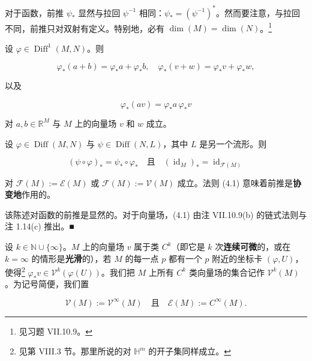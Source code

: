 \begin{remark}

\begin{items}
\item

对于函数，前推 $ \psi_{*} $ 显然与拉回 $ \psi^{-1} $ 相同：$ \psi_{*} = (\psi^{-1})^{*} $。然而要注意，与拉回不同，前推只对双射有定义。特别地，必有 $ \dim(M) = \dim(N) $。\footnote{见习题 VII.10.9。}

\item

设 $ \varphi \in \operatorname{Diff}^{1}(M,N) $。则

\[
\varphi_{*}(a+b) = \varphi_{*}a + \varphi_{*}b , \quad \varphi_{*}(v+w) = \varphi_{*}v + \varphi_{*}w ,
\]

以及

\[
\varphi_{*}(av) = \varphi_{*}a\,\varphi_{*}v
\]

对 $ a, b \in \mathbb{R}^{M} $ 与 $ M $ 上的向量场 $ v $ 和 $ w $ 成立。

\item

设 $ \varphi \in \operatorname{Diff}(M,N) $ 与 $ \psi \in \operatorname{Diff}(N,L) $，其中 $ L $ 是另一个流形。则

\begin{equation}
(\psi \circ \varphi)_{*} = \psi_{*} \circ \varphi_{*} \quad \text{且} \quad (\operatorname{id}_{M})_{*} = \operatorname{id}_{\mathcal{F}(M)}\tag{4.1}
\end{equation}

对 $ \mathcal{F}(M) := \mathcal{E}(M) $ 或 $ \mathcal{F}(M) := \mathcal{V}(M) $ 成立。法则 (4.1) 意味着前推是\textbf{协变地}作用的。

\proofhead
该陈述对函数的前推是显然的。对于向量场，(4.1) 由注 VII.10.9(b) 的链式法则与注 1.14(c) 推出。\nobreak\hspace{0.35em}■
\end{items}

设 $ k \in \mathbb{N} \cup \{\infty\} $。$ M $ 上的向量场 $ v $ 属于类 $ C^{k} $（即它是 $ k $ 次\textbf{连续可微}的，或在 $ k = \infty $ 的情形是\textbf{光滑}的），若 $ M $ 的每一点 $ p $ 都有一个 $ p $ 附近的坐标卡 $ (\varphi,U) $，使得\footnote{见第 VIII.3 节。那里所说的对 $ \mathbb{H}^{m} $ 的开子集同样成立。} $ \varphi_{*}v \in \mathcal{V}^{k}(\varphi(U)) $。我们把 $ M $ 上所有 $ C^{k} $ 类向量场的集合记作 $ \mathcal{V}^{k}(M) $。为记号简便，我们置

\[
\mathcal{V}(M) := \mathcal{V}^{\infty}(M) \quad \text{且} \quad \mathcal{E}(M) := C^{\infty}(M) .
\]
\end{remark}

